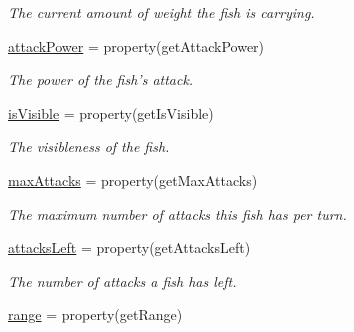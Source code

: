 \begin{DoxyCompactItemize}
\begin{DoxyCompactList}\small\item\em \-The current amount of weight the fish is carrying. \end{DoxyCompactList}\item 
\hypertarget{classGameObject_1_1Fish_aa81f3e26d9f5d26b8ebfedda3709b839}{\hyperlink{classGameObject_1_1Fish_aa81f3e26d9f5d26b8ebfedda3709b839}{attack\-Power} = property(get\-Attack\-Power)}\label{classGameObject_1_1Fish_aa81f3e26d9f5d26b8ebfedda3709b839}

\begin{DoxyCompactList}\small\item\em \-The power of the fish's attack. \end{DoxyCompactList}\item 
\hypertarget{classGameObject_1_1Fish_a71357edcfbcf3fdcfc686cb176f647ce}{\hyperlink{classGameObject_1_1Fish_a71357edcfbcf3fdcfc686cb176f647ce}{is\-Visible} = property(get\-Is\-Visible)}\label{classGameObject_1_1Fish_a71357edcfbcf3fdcfc686cb176f647ce}

\begin{DoxyCompactList}\small\item\em \-The visibleness of the fish. \end{DoxyCompactList}\item 
\hypertarget{classGameObject_1_1Fish_a7ad1770001c9ea145235eff686dd296d}{\hyperlink{classGameObject_1_1Fish_a7ad1770001c9ea145235eff686dd296d}{max\-Attacks} = property(get\-Max\-Attacks)}\label{classGameObject_1_1Fish_a7ad1770001c9ea145235eff686dd296d}

\begin{DoxyCompactList}\small\item\em \-The maximum number of attacks this fish has per turn. \end{DoxyCompactList}\item 
\hypertarget{classGameObject_1_1Fish_ad9b2380ef70333312f63c8c0573de64e}{\hyperlink{classGameObject_1_1Fish_ad9b2380ef70333312f63c8c0573de64e}{attacks\-Left} = property(get\-Attacks\-Left)}\label{classGameObject_1_1Fish_ad9b2380ef70333312f63c8c0573de64e}

\begin{DoxyCompactList}\small\item\em \-The number of attacks a fish has left. \end{DoxyCompactList}\item 
\hypertarget{classGameObject_1_1Fish_adc5ca5fcd9a15a1c70f53203230e6cbe}{\hyperlink{classGameObject_1_1Fish_adc5ca5fcd9a15a1c70f53203230e6cbe}{range} = property(get\-Range)}\label{classGameObject_1_1Fish_adc5ca5fcd9a15a1c70f53203230e6cbe}


\end{DoxyCompactItemize}
